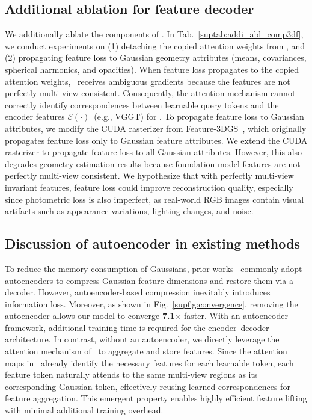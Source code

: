 \subsection{Additional ablation for feature decoder}
We additionally ablate the components of \oursF. In Tab.~\ref{suptab:addi_abl_comp3df}, we conduct experiments on (1) detaching the copied attention weights from \ours, and (2) propagating feature loss to Gaussian geometry attributes (means, covariances, spherical harmonics, and opacities). When feature loss propagates to the copied attention weights, \ours\ receives ambiguous gradients because the features are not perfectly multi-view consistent. Consequently, the attention mechanism cannot correctly identify correspondences between learnable query tokens and the encoder features $\mathcal{E}(\cdot)$~(e.g., VGGT) for \ours.
To propagate feature loss to Gaussian attributes, we modify the CUDA rasterizer from Feature-3DGS~\cite{zhou2024feature}, which originally propagates feature loss only to Gaussian feature attributes. We extend the CUDA rasterizer to propagate feature loss to all Gaussian attributes. However, this also degrades geometry estimation results because foundation model features are not perfectly multi-view consistent.
We hypothesize that with perfectly multi-view invariant features, feature loss could improve reconstruction quality, especially since photometric loss is also imperfect, as real-world RGB images contain visual artifacts such as appearance variations, lighting changes, and noise.



\subsection{Discussion of autoencoder in existing methods}

To reduce the memory consumption of Gaussians, prior works~\cite{fan2024large, lee2025cf3} commonly adopt autoencoders to compress Gaussian feature dimensions and restore them via a decoder. However, autoencoder-based compression inevitably introduces information loss.
Moreover, as shown in Fig.~\ref{supfig:convergence}, removing the autoencoder allows our model to converge \textbf{7.1$\times$} faster. With an autoencoder framework, additional training time is required for the encoder–decoder architecture. In contrast, without an autoencoder, we directly leverage the attention mechanism of \ours\ to aggregate and store features. Since the attention maps in \ours\ already identify the necessary features for each learnable token, each feature token naturally attends to the same multi-view regions as its corresponding Gaussian token, effectively reusing learned correspondences for feature aggregation. This emergent property enables highly efficient feature lifting with minimal additional training overhead.

